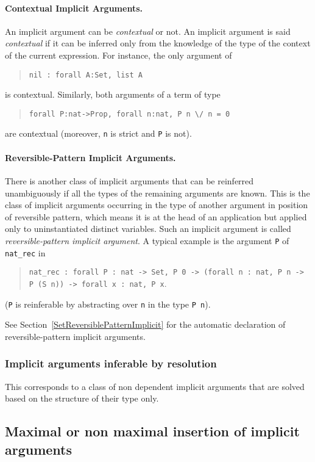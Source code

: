 \paragraph{Contextual Implicit Arguments.} 
An implicit argument can be {\em contextual} or not. An implicit
argument is said {\em contextual} if it can be inferred only from the
knowledge of the type of the context of the current expression. For
instance, the only argument of
\begin{quote}
\verb|nil : forall A:Set, list A|
\end{quote}
is contextual. Similarly, both arguments of a term of type
\begin{quote}
\verb|forall P:nat->Prop, forall n:nat, P n \/ n = 0|
\end{quote}
are contextual (moreover, {\tt n} is strict and {\tt P} is not).

\paragraph{Reversible-Pattern Implicit Arguments.}
There is another class of implicit arguments that can be reinferred
unambiguously if all the types of the remaining arguments are
known. This is the class of implicit arguments occurring in the type
of another argument in position of reversible pattern, which means it
is at the head of an application but applied only to uninstantiated
distinct variables. Such an implicit argument is called {\em
reversible-pattern implicit argument}. A typical example is the
argument {\tt P} of {\tt nat\_rec} in
\begin{quote}
{\tt nat\_rec : forall P : nat -> Set,
       P 0 -> (forall n : nat, P n -> P (S n)) -> forall x : nat, P x}.
\end{quote}
({\tt P} is reinferable by abstracting over {\tt n} in the type {\tt P n}).

See Section~\ref{SetReversiblePatternImplicit} for the automatic declaration
of reversible-pattern implicit arguments.

\subsubsection{Implicit arguments inferable by resolution}

This corresponds to a class of non dependent implicit arguments that
are solved based on the structure of their type only.

\subsection{Maximal or non maximal insertion of implicit arguments}

